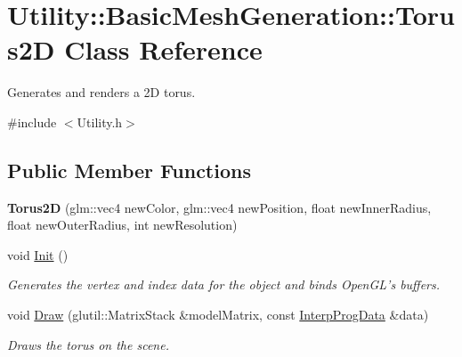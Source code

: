 \hypertarget{class_utility_1_1_basic_mesh_generation_1_1_torus2_d}{\section{Utility\-:\-:Basic\-Mesh\-Generation\-:\-:Torus2\-D Class Reference}
\label{class_utility_1_1_basic_mesh_generation_1_1_torus2_d}
}


Generates and renders a 2\-D torus.  




{\ttfamily \#include $<$Utility.\-h$>$}

\subsection*{Public Member Functions}
\begin{DoxyCompactItemize}
\item 
\hypertarget{class_utility_1_1_basic_mesh_generation_1_1_torus2_d_a605dc54a21bdb6d90fc37b1e4ce1f0e9}{{\bfseries Torus2\-D} (glm\-::vec4 new\-Color, glm\-::vec4 new\-Position, float new\-Inner\-Radius, float new\-Outer\-Radius, int new\-Resolution)}\label{class_utility_1_1_basic_mesh_generation_1_1_torus2_d_a605dc54a21bdb6d90fc37b1e4ce1f0e9}

\item 
void \hyperlink{class_utility_1_1_basic_mesh_generation_1_1_torus2_d_a9758c5641d853f3386caee4068b070f1}{Init} ()
\begin{DoxyCompactList}\small\item\em Generates the vertex and index data for the object and binds Open\-G\-L's buffers. \end{DoxyCompactList}\item 
\hypertarget{class_utility_1_1_basic_mesh_generation_1_1_torus2_d_a9ea715b46c9021e8d594b2b4fe5052f0}{void \hyperlink{class_utility_1_1_basic_mesh_generation_1_1_torus2_d_a9ea715b46c9021e8d594b2b4fe5052f0}{Draw} (glutil\-::\-Matrix\-Stack \&model\-Matrix, const \hyperlink{struct_interp_prog_data}{Interp\-Prog\-Data} \&data)}\label{class_utility_1_1_basic_mesh_generation_1_1_torus2_d_a9ea715b46c9021e8d594b2b4fe5052f0}

\begin{DoxyCompactList}\small\item\em Draws the torus on the scene. \end{DoxyCompactList}\end{DoxyCompactItemize}
